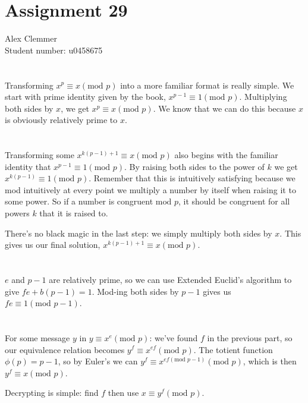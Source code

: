 \documentclass[a4paper]{article}
\begin{document}
\section*{Assignment 29}
Alex Clemmer\\
Student number: u0458675

\section{}

Transforming $x^p \equiv x (\mbox{mod }p)$ into a more familiar format is really simple. We start with prime identity given by the book, $x^{p-1} \equiv 1(\mbox{mod } p)$. Multiplying both sides by $x$, we get $x^p \equiv x(\mbox{mod } p)$. We know that we can do this because $x$ is obviously relatively prime to $x$.

\section{}

Transforming some $x^{k(p-1)+1} \equiv x (\mbox{mod } p)$ also begins with the familiar identity that $x^{p-1} \equiv 1(\mbox{mod } p)$. By raising both sides to the power of $k$ we get $x^{k(p-1)} \equiv 1(\mbox{mod } p)$. Remember that this is intuitively satisfying because we mod intuitively at every point we multiply a number by itself when raising it to some power. So if a number is congruent $\mbox{mod } p$, it should be congruent for all powers $k$ that it is raised to.

There's no black magic in the last step: we simply multiply both sides by $x$. This gives us our final solution, $x^{k(p-1)+1} \equiv x (\mbox{mod } p)$.

\section{}

$e$ and $p-1$ are relatively prime, so we can use Extended Euclid's algorithm to give $fe + b(p-1) = 1$. Mod-ing both sides by $p-1$ gives us $fe \equiv 1(\mbox{mod }p-1)$.

\section{}

For some message $y$ in $y \equiv x^e (\mbox{mod } p)$: we've found $f$ in the previous part, so our equivalence relation becomes $y^f \equiv x^{ef} (\mbox{mod }p)$. The totient function $\phi(p) = p-1$, so by Euler's we can $y^f \equiv x^{ef (\mbox{mod }p-1)} (\mbox{mod } p)$, which is then $y^f \equiv x(\mbox{mod } p)$.

Decrypting is simple: find $f$ then use $x \equiv y^f (\mbox{mod } p)$.
\end{document}

